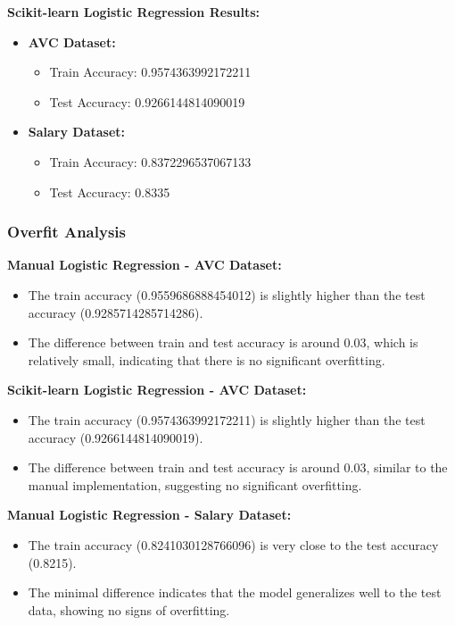 \documentclass[a4paper,12pt]{article}
\begin{document}
\textbf{Scikit-learn Logistic Regression Results:}
\begin{itemize}
    \item \textbf{AVC Dataset:}
        \begin{itemize}
            \item Train Accuracy: 0.9574363992172211
            \item Test Accuracy: 0.9266144814090019
        \end{itemize}
    \item \textbf{Salary Dataset:}
        \begin{itemize}
            \item Train Accuracy: 0.8372296537067133
            \item Test Accuracy: 0.8335
        \end{itemize}
\end{itemize}

\subsubsection{Overfit Analysis}

\textbf{Manual Logistic Regression - AVC Dataset:}
\begin{itemize}
    \item The train accuracy (0.9559686888454012) is slightly higher than the test accuracy (0.9285714285714286).
    \item The difference between train and test accuracy is around 0.03, which is relatively small, indicating that there is no significant overfitting.
\end{itemize}

\newpage
\textbf{Scikit-learn Logistic Regression - AVC Dataset:}
\begin{itemize}
    \item The train accuracy (0.9574363992172211) is slightly higher than the test accuracy (0.9266144814090019).
    \item The difference between train and test accuracy is around 0.03, similar to the manual implementation, suggesting no significant overfitting.
\end{itemize}

\textbf{Manual Logistic Regression - Salary Dataset:}
\begin{itemize}
    \item The train accuracy (0.8241030128766096) is very close to the test accuracy (0.8215).
    \item The minimal difference indicates that the model generalizes well to the test data, showing no signs of overfitting.
\end{itemize}
\end{document}
